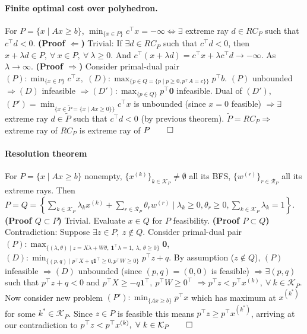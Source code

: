 \documentclass{article}
\begin{document}
\paragraph{Finite optimal cost over polyhedron.} For $P=\{x\mid Ax \geq b\}$, $\min_{\{x \in P\}} c^\top x = -\infty \iff \exists$ extreme ray $d\in RC_P$ such that $c^\top d < 0$. 
\textbf{(Proof $\Leftarrow$)} Trivial: If $\exists d \in RC_P$ such that $c^\top d < 0$, then $x + \lambda d \in P,\ \forall\ x\in P,\ \forall\ \lambda \geq 0$. And $c^\top (x + \lambda d) = c^\top x + \lambda c^\top d \to -\infty$. As $\lambda \rightarrow \infty$. 
\textbf{(Proof $\Rightarrow$)} Consider primal-dual pair $(P):\min_{\{x \in P\}} c^\top x,\; (D):\max_{\{p \in Q=\{p\mid p\geq 0, p^\top A=c\}\}} p^\top b$. $(P)$ unbounded $\Longrightarrow (D)$ infeasible $\Longrightarrow (D'):\max_{\{p \in Q\}}p^\top \mathbf{0}$ infeasible. Dual of $(D')$, $(P') = \min_{\{x \in \tilde P=\{x\mid Ax\geq 0\}\}} c^\top x$ is unbounded (since $x = 0$ feasible) $\Longrightarrow \exists$ extreme ray $d \in \tilde P$ such that $c^\top d < 0$ (by previous theorem).
$\tilde P = RC_P \Longrightarrow$ extreme ray of $RC_P$ is extreme ray of $P \qed$

\paragraph{Resolution theorem}
For $P = \{x \mid Ax\geq b\}$ nonempty, $\{x^{(k)}\}_{k\in \mathcal K_P} \neq \emptyset$ all its BFS, $\{w^{(r)}\}_{r\in \mathcal R_P}$ all its extreme rays. 
Then $P = Q = \left\{\sum_{k\in\mathcal K_P} \lambda_kx^{(k)} + \sum_{r\in\mathcal R_P}\theta_rw^{(r)} \mid \lambda_k \geq 0, \theta_r \geq 0, \sum_{k\in\mathcal K_P}\lambda_k = 1\right\}$. 
\textbf{(Proof $Q \subset P$)} Trivial. Evaluate $x\in Q$ for $P$ feasibility.
\textbf{(Proof $P \subset Q$)} Contradiction: Suppose $\exists z\in P,\ z \notin Q$. Consider primal-dual pair $(P):\max_{\{(\lambda, \theta) \mid z = X\lambda + W\theta,\ \mathbf{1}^\top \lambda = 1,\ \lambda,\ \theta \geq 0\}} \mathbf{0}$, $(D):\min_{\{(p,q)\mid p^\top X + q\mathbf{1}^\top \geq 0,  p^\top W \geq 0 \}}p^\top z + q$. 
By assumption ($z \notin Q$), $(P)$ infeasible $\Longrightarrow (D)$ unbounded (since $(p,q)=(0,0)$ is feasible) $\Longrightarrow \exists (p,q)$ such that $p^\top z + q < 0$ and $p^\top X \geq -q\mathbf{1}^\top,\ p^\top W\geq 0^\top$
$\Longrightarrow p^\top z < p^\top x^{(k)},\ \forall\ k\in\mathcal K_P$. 
Now consider new problem $(P'): \min_{\{Ax \geq b\}}p^\top x$ which has maximum at $x^{(k^*)}$ for some $k^*\in\mathcal K_P$. Since $z\in P$ is feasible this means $p^\top z \geq p^\top x^{(k^*)}$, arriving at our contradiction to $p^\top z < p^\top x^{(k)},\ \forall\ k\in\mathcal K_P\qed$
\end{document}
